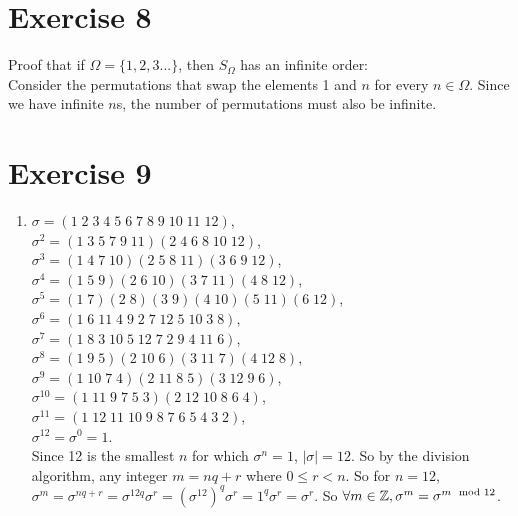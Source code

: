 \documentclass[12pt]{article}
\begin{document}
    \section*{Exercise 8}
    Proof that if $\Omega = \{1, 2, 3 ...\}$,
    then $S_{\Omega}$ has an infinite order: \\
    Consider the permutations that swap the elements 1 and $n$
    for every $n \in \Omega$.
    Since we have infinite $n$s, the number of permutations must also be
    infinite.
      

    \section*{Exercise 9}
    \begin{enumerate}[label=\textbf{\alph*.}]
        \item 
            $\sigma = (1\;2\;3\;4\;5\;6\;7\;8\;9\;10\;11\;12)$, \\
            $\sigma^2 = (1\;3\;5\;7\;9\;11)(2\;4\;6\;8\;10\;12)$, \\
            $\sigma^3 = (1\;4\;7\;10)(2\;5\;8\;11)(3\;6\;9\;12)$, \\
            $\sigma^4 = (1\;5\;9)(2\;6\;10)(3\;7\;11)(4\;8\;12)$, \\
            $\sigma^5 = (1\;7)(2\;8)(3\;9)(4\;10)(5\;11)(6\;12)$, \\
            $\sigma^6 = (1\;6\;11\;4\;9\;2\;7\;12\;5\;10\;3\;8)$, \\
            $\sigma^7 = (1\;8\;3\;10\;5\;12\;7\;2\;9\;4\;11\;6)$, \\
            $\sigma^8 = (1\;9\;5)(2\;10\;6)(3\;11\;7)(4\;12\;8)$, \\
            $\sigma^9 = (1\;10\;7\;4)(2\;11\;8\;5)(3\;12\;9\;6)$, \\
            $\sigma^{10} = (1\;11\;9\;7\;5\;3)(2\;12\;10\;8\;6\;4)$, \\
            $\sigma^{11} = (1\;12\;11\;10\;9\;8\;7\;6\;5\;4\;3\;2)$, \\
            $\sigma^{12} = \sigma^0 = 1$. \\
            Since 12 is the smallest $n$ for which $\sigma^n = 1$, 
            $|\sigma| = 12$.
            So by the division algorithm, any integer $m = nq + r$
            where $0 \leqslant r < n$.
            So for $n = 12$, $\sigma^m = \sigma^{nq + r}
            = \sigma^{12q}\sigma^r
            = (\sigma^12)^q\sigma^r
            = 1^q\sigma^r 
            = \sigma^r$.
            So $\forall m \in \mathbb{Z}, \sigma^m = \sigma^{m \mod 12}$.

\end{enumerate}
\end{document}
